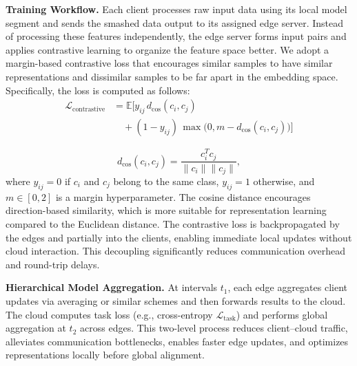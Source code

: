\documentclass[letterpaper]{article} %
\begin{document}
     \textbf{Training Workflow.} Each client processes raw input data using its local model segment and sends the smashed data output to its assigned edge server. Instead of processing these features independently, the edge server forms input pairs and applies contrastive learning to organize the feature space better. We adopt a margin-based contrastive loss that encourages similar samples to have similar representations and dissimilar samples to be far apart in the embedding space. Specifically, the loss is computed as follows:
    \begin{align}
        \mathcal{L}_{\text{contrastive}} &= \mathbb{E}\Big[ y_{ij} \, d_{\mathrm{cos}}(c_i, c_j) \\
        &\quad + (1 - y_{ij}) \, \max\big(0, m - d_{\mathrm{cos}}(c_i, c_j)\big) \Big] \nonumber
    \end{align}
    
    \begin{equation}
        d_{\text{cos}}(c_i, c_j) = \frac{c_i^T c_j}{\|c_i\| \|c_j\|},
    \end{equation}
     \noindent where $y_{ij} = 0$ if $c_i$ and $c_j$ belong to the same class, $y_{ij} = 1$ otherwise, and $m \in [0, 2]$ is a margin hyperparameter. The cosine distance encourages direction-based similarity, which is more suitable for representation learning compared to the Euclidean distance. The contrastive loss is backpropagated by the edges and partially into the clients, enabling immediate local updates without cloud interaction. This decoupling significantly reduces communication overhead and round-trip delays.
    
    \textbf{Hierarchical Model Aggregation.} At intervals $t_1$, each edge aggregates client updates via averaging or similar schemes and then forwards results to the cloud. The cloud computes task loss (e.g., cross-entropy $\mathcal{L}_{\text{task}}$) and performs global aggregation at $t_2$ across edges. This two-level process reduces client–cloud traffic, alleviates communication bottlenecks, enables faster edge updates, and optimizes representations locally before global alignment.
\end{document}
